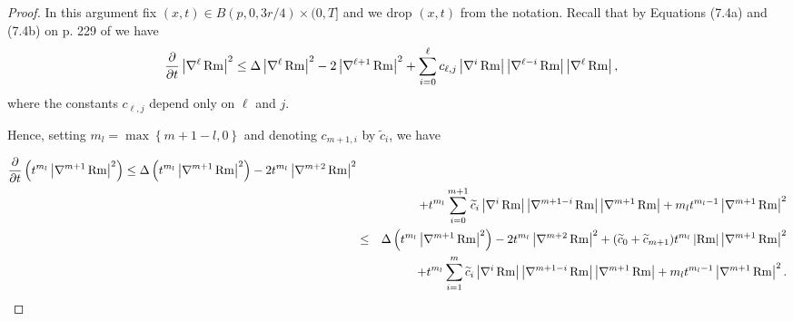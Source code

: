 \begin{proof}
\sketch In this argument fix
$(x,t)\in B(p,0,3r/4)\times (0,T]$ and we drop $(x,t)$ from the
notation. Recall that by Equations (7.4a) and (7.4b) on p. 229 of
\cite{ChowKnopf}  we have
\begin{align}
\frac{\partial}{\partial t}\left\vert \nabla^{\ell
}\operatorname{Rm}\right\vert ^{2} & \leq\Delta\left\vert
\nabla^{\ell }\operatorname{Rm}\right\vert ^{2} -2\left\vert
\nabla^{\ell +1}\operatorname{Rm}\right\vert ^{2}+\sum_{i=0} ^{\ell
}c_{\ell,j}\left\vert \nabla^{i}\operatorname{Rm}\right\vert
\left\vert \nabla^{\ell -i}\operatorname{Rm}\right\vert \left\vert
\nabla^{\ell } \operatorname{Rm}\right\vert, \label{curderfor}
\end{align}
where the constants $c_{\ell,j}$ depend only on $\ell$ and $j$.


Hence, setting $m_l= \max\left\{ m+1-l,0\right\}$ and denoting
$c_{m+1,i}$ by $\tilde c_i$, we have

\begin{eqnarray}
\lefteqn{\frac{\partial}{\partial t}\left(  t^{m_l}\left\vert
\nabla^{m+1}\Rm\right\vert ^{2}\right)
 \leq\Delta\left(  t^{m_l }\left\vert \nabla
^{m+1}\Rm\right\vert ^{2}\right)  -2t^{m_l }
\left\vert \nabla^{m+2}\Rm\right\vert ^{2}}\label{1steqn}\\
& & +t^{m_l  }\sum_{i=0}^{m+1}\tilde c_{i}\left\vert \nabla
^{i}\Rm\right\vert \left\vert
\nabla^{m+1-i}\Rm \right\vert \left\vert
\nabla^{m+1}\Rm\right\vert
 +m_l  t^{m_l -1}\left\vert \nabla^{m+1}\Rm\right\vert ^{2}\nonumber\\
&  \leq & \Delta\left(  t^{m_l }\left\vert \nabla
^{m+1}\Rm\right\vert ^{2}\right)  -2t^{m_l }
\left\vert \nabla^{m+2}\Rm\right\vert ^{2} +(\tilde
c_{0}+\tilde
c_{m+1})t^{m_l}\left\vert\Rm\right\vert\left\vert\nabla^{m+1}\Rm
\right\vert^2\nonumber\\ & &+ t^{m_l }\sum_{i=1}^{m}\tilde
c_{i}\left\vert \nabla
^{i}\Rm\right\vert \left\vert \nabla^{m+1-i}\Rm%
\right\vert \left\vert \nabla^{m+1}\Rm\right\vert
+m_l  t^{m_l -1}\left\vert \nabla^{m+1}\Rm\right\vert
^{2}.\nonumber
\end{eqnarray}


\end{proof}
